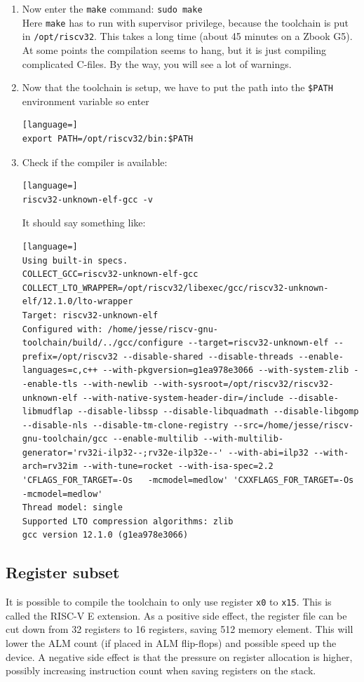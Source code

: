 \documentclass[12pt]{article}
\begin{document}
\begin{enumerate}
\item Now enter the \lstinline|make| command: \lstinline|sudo make|\\
Here \lstinline|make| has to run with supervisor privilege, because the toolchain is put in \lstinline|/opt/riscv32|. This takes a long time (about 45 minutes on a Zbook G5). At some points the compilation seems to hang, but it is just compiling complicated C-files. By the way, you will see a lot of warnings.
\item Now that the toolchain is setup, we have to put the path into the \lstinline|$PATH| environment variable so enter
\begin{lstlisting}[language=]
export PATH=/opt/riscv32/bin:$PATH
\end{lstlisting}
\item Check if the compiler is available:
\begin{lstlisting}[language=]
riscv32-unknown-elf-gcc -v
\end{lstlisting}
It should say something like:
\begin{lstlisting}[language=]
Using built-in specs.
COLLECT_GCC=riscv32-unknown-elf-gcc
COLLECT_LTO_WRAPPER=/opt/riscv32/libexec/gcc/riscv32-unknown-elf/12.1.0/lto-wrapper
Target: riscv32-unknown-elf
Configured with: /home/jesse/riscv-gnu-toolchain/build/../gcc/configure --target=riscv32-unknown-elf --prefix=/opt/riscv32 --disable-shared --disable-threads --enable-languages=c,c++ --with-pkgversion=g1ea978e3066 --with-system-zlib --enable-tls --with-newlib --with-sysroot=/opt/riscv32/riscv32-unknown-elf --with-native-system-header-dir=/include --disable-libmudflap --disable-libssp --disable-libquadmath --disable-libgomp --disable-nls --disable-tm-clone-registry --src=/home/jesse/riscv-gnu-toolchain/gcc --enable-multilib --with-multilib-generator='rv32i-ilp32--;rv32e-ilp32e--' --with-abi=ilp32 --with-arch=rv32im --with-tune=rocket --with-isa-spec=2.2 'CFLAGS_FOR_TARGET=-Os   -mcmodel=medlow' 'CXXFLAGS_FOR_TARGET=-Os   -mcmodel=medlow'
Thread model: single
Supported LTO compression algorithms: zlib
gcc version 12.1.0 (g1ea978e3066) 
\end{lstlisting}
\end{enumerate}

\subsection{Register subset}
It is possible to compile the toolchain to only use register \texttt{x0} to \texttt{x15}. This is called the RISC-V E extension. As a positive side effect, the register file can be cut down from 32 registers to 16 registers, saving 512 memory element. This will lower the ALM count (if placed in ALM flip-flops) and possible speed up the device. A negative side effect is that the pressure on register allocation is higher, possibly increasing instruction count when saving registers on the stack.
\end{document}
